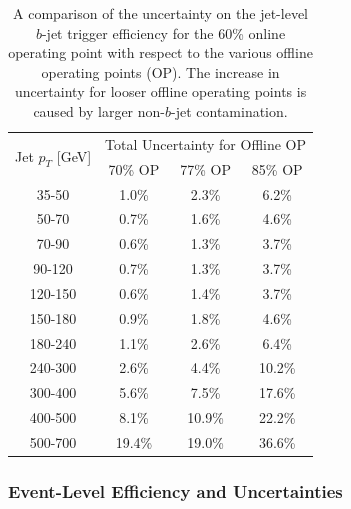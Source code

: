 \begin{table}[!bht]
  \begin{center}
  \begin{tabular}{|c||c|c|c|}
    \hline
    \multirow{2}{*}{Jet $p_T$ [GeV]} &\multicolumn{3}{c|}{Total Uncertainty for Offline OP} \\ \cline{2-4} 

                & \hspace{1.5mm}70\% OP\hspace{1.5mm} & \hspace{1.5mm}77\% OP\hspace{1.5mm} & \hspace{1.5mm}85\% OP\hspace{1.5mm} \\
    \hline
    35-50   & 1.0\%   & 2.3\%   & 6.2\%  \\
    50-70   & 0.7\%   & 1.6\%   & 4.6\%  \\
    70-90   & 0.6\%   & 1.3\%   & 3.7\%  \\
    90-120  & 0.7\%   & 1.3\%   & 3.7\%  \\
    120-150 & 0.6\%   & 1.4\%   & 3.7\%  \\
    150-180 & 0.9\%   & 1.8\%   & 4.6\%  \\
    180-240 & 1.1\%   & 2.6\%   & 6.4\%  \\
    \hline          
    240-300 & 2.6\%   & 4.4\%   & 10.2\% \\
    300-400 & 5.6\%   & 7.5\%   & 17.6\% \\
    400-500 & 8.1\%   & 10.9\%  & 22.2\% \\
    500-700 & 19.4\%  & 19.0\%  & 36.6\% \\
    \hline
  \end{tabular}
  \vspace{10pt}
  \end{center}
    \vspace{-1.5em}
    \caption[A comparison of the uncertainty on the jet-level $b$-jet trigger efficiency
      for various offline operating points.]
            {
    A comparison of the uncertainty on the jet-level $b$-jet trigger efficiency
    for the 60\% online operating point with respect to the various offline operating points (OP).
    The increase in uncertainty for looser offline operating points is caused by larger non-$b$-jet contamination.
            }
  \label{tab:trig-bTrig_jetSys_opComp}
  \end{table}

\newpage
\subsubsection{Event-Level Efficiency and Uncertainties}
\label{sec:trig-eventLevelEff}

